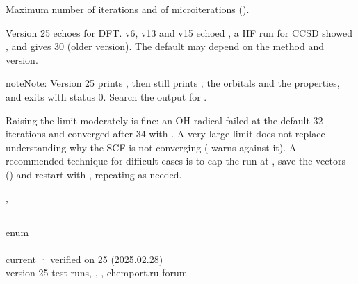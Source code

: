\documentclass[letterpaper,10pt,english,openany,oneside]{sphinxmanual}
\begin{document}
\sphinxAtStartPar
Maximum number of iterations and of microiterations ().

\sphinxAtStartPar
{} Version 25 echoes  for DFT. v6, v13 and v15 echoed , a HF run for CCSD showed , and
 gives 30 (older version). The default may depend on the method and version.

\begin{sphinxadmonition}{note}{Note:}
\sphinxAtStartPar
{} Version 25 prints , then still prints ,
the orbitals and the properties, and exits with status 0. Search the output for .

\sphinxAtStartPar
Raising the limit moderately is fine: an OH radical failed at the default 32 iterations and converged after
34 with . A very large limit does not replace understanding why the SCF is not converging
( warns against it). A recommended technique for difficult cases is to cap the run at
, save the vectors () and restart with , repeating as needed.
\end{sphinxadmonition}

\sphinxAtStartPar
{} {\hyperref[\detokenize{reference/scf:scf-convergence}]{}}, {\hyperref[\detokenize{reference/guess:guess-read}]{}}


\subsection{}
\label{\detokenize{reference/scf:procedure}}\label{\detokenize{reference/scf:scf-procedure}}
\ignorespaces 
\sphinxAtStartPar
{} enum\\
 \\
 current · verified on 25 (2025.02.28)\\
 version 25 test runs, , , chemport.ru forum
\end{document}
